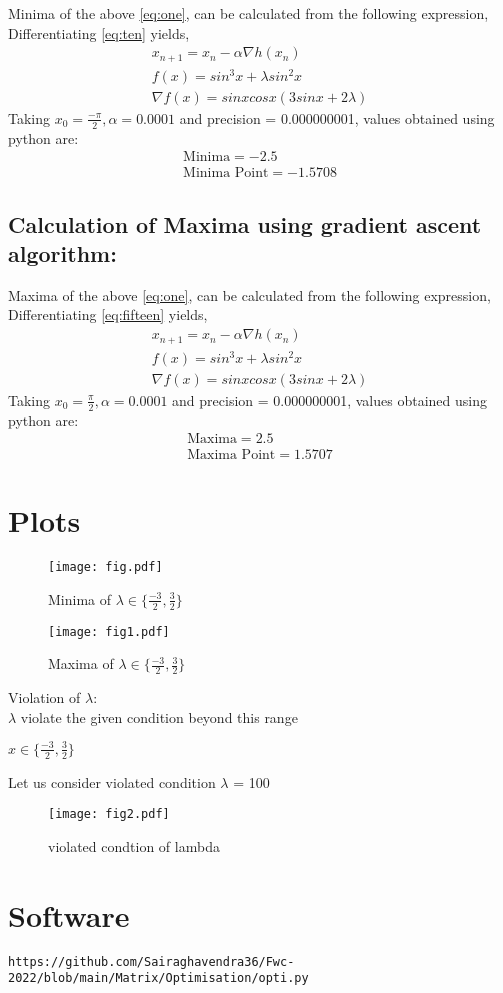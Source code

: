 \documentclass[journal,12pt,twocolumn]{IEEEtran}
\begin{document}
{Minima of the above \eqref{eq:one}, can be calculated from the following expression,}
Differentiating \eqref{eq:ten} yields,
\begin{align}
       \boxed{x_{n+1} = x_n - \alpha \nabla h(x_n)}\\
       \label{eq:ten}
		f(x)= sin^3 x+\lambda sin^2 x \\ 
		\nabla f(x) = sinx cosx (3sinx+2\lambda)
\end{align}
Taking $x_0=\frac{-\pi}{2},\alpha=0.0001$ and precision = 0.000000001, values obtained using python are:
    \begin{align}
        \boxed{\text{Minima} =-2.5}\\     
        \boxed{\text{Minima Point} = -1.5708}
    \end{align}  
\subsection{Calculation of Maxima using gradient ascent algorithm:}
{Maxima of the above \eqref{eq:one}, can be calculated from the following expression,}
Differentiating \eqref{eq:fifteen} yields,
\begin{align}
       \boxed{x_{n+1} = x_n - \alpha \nabla h(x_n)}\\
       \label{eq:fifteen}
	f(x)= sin^3 x+\lambda sin^2 x \\ 
	\nabla f(x) = sinx cosx (3sinx+2\lambda)
\end{align}
Taking $x_0=\frac{\pi}{2},\alpha=0.0001$ and precision = 0.000000001, values obtained using python are:
    \begin{align}
        \boxed{\text{Maxima} =2.5}\\     
        \boxed{\text{Maxima Point} = 1.5707}
    \end{align}
    
\section{\textbf{Plots}}
\begin{figure}
\texttt{[image: fig.pdf]}
\caption{Minima of $\lambda \in \{\frac{-3}{2},\frac{3}{2}\}$}
\label{fig:Figure}
\texttt{[image: fig1.pdf]}
\caption{Maxima of $\lambda \in \{\frac{-3}{2},\frac{3}{2}\}$}
\label{fig:Figure}
\end{figure}
Violation of $\lambda$:\\ 
$\lambda$ violate the given condition beyond this range 
\begin{center}
$x \in \{ \frac{-3}{2}, \frac{3}{2}\}$
\end{center}
 Let us consider violated condition $\lambda$ = 100
 \begin{figure}
  \texttt{[image: fig2.pdf]}
\caption{violated condtion of lambda}
\label{fig:Figure}
\end{figure}

\section{\textbf{Software}}
\begin{lstlisting}
https://github.com/Sairaghavendra36/Fwc-2022/blob/main/Matrix/Optimisation/opti.py
\end{lstlisting}
\end{document}

